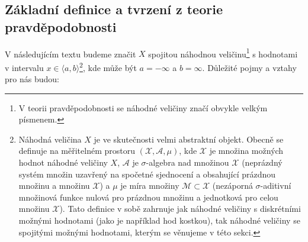 \documentclass[a4paper,11pt,twoside]{article}
\theoremstyle{red}
\theoremstyle{green}
\begin{document}
    \subsection{Základní definice a tvrzení z teorie pravděpodobnosti}
    \label{sec:Pravdepodobnost}
        V následujícím textu budeme značit $X$ spojitou náhodnou veličinu\footnote{
            V teorii pravděpodobnosti se náhodné veličiny značí obvykle velkým písmenem.
        } s hodnotami v intervalu $x\in\langle a,b\rangle$\footnote{
            Náhodná veličina $X$ je ve skutečnosti velmi abstraktní objekt.
            Obecně se definuje na měřitelném prostoru $(\mathcal{X},\mathcal{A},\mu)$, kde $\mathcal{X}$ je množina možných hodnot náhodné veličiny $X$, $\mathcal{A}$ je $\sigma$-algebra nad množinou $\mathcal{X}$ (neprázdný systém množin uzavřený na spočetné sjednocení a obsahující prázdnou množinu a množinu $\mathcal{X}$) a $\mu$ je míra množiny $\mathcal{M}\subset\mathcal{X}$ (nezáporná $\sigma$-aditivní množinová funkce nulová pro prázdnou množinu a jednotková pro celou množinu $\mathcal{X}$).
            Tato definice v sobě zahrnuje jak náhodné veličiny s diskrétními možnými hodnotami (jako je například hod kostkou), tak náhodné veličiny se spojitými možnými hodnotami, kterým se věnujeme v této sekci.
        }, kde může být $a=-\infty$ a $b=\infty$.
        Důležité pojmy a vztahy pro nás budou:
\end{document}
